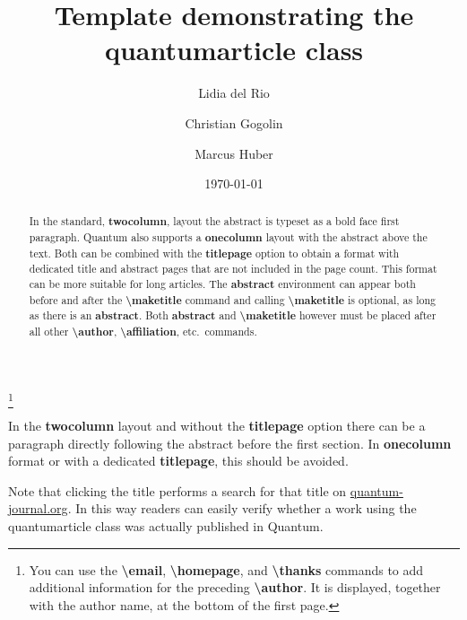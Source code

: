 \documentclass[prx,a4paper,aps,twocolumn,superscriptaddress,11pt]{quantumarticle}
\begin{document}
\title{Template demonstrating the quantumarticle class}
\date{\today}
\author{Lidia del Rio}
\author{Christian Gogolin}
\thanks{You can use the \textbf{\textbackslash{}email}, \textbf{\textbackslash{}homepage}, and \textbf{\textbackslash{}thanks} commands to add additional information for the preceding \textbf{\textbackslash{}author}. It is displayed, together with the author name, at the bottom of the first page.}
\author{Marcus Huber}

\maketitle

\begin{abstract}
  In the standard, \textbf{twocolumn}, layout the abstract is typeset as a bold face first paragraph.
  Quantum also supports a \textbf{onecolumn} layout with the abstract above the text.
  Both can be combined with the \textbf{titlepage} option to obtain a format with dedicated title and abstract pages that are not included in the page count.
  This format can be more suitable for long articles.
  The \textbf{abstract} environment can appear both before and after the \textbf{\textbackslash{}maketitle} command and calling \textbf{\textbackslash{}maketitle} is optional, as long as there is an \textbf{abstract}.
  Both \textbf{abstract} and \textbf{\textbackslash{}maketitle} however must be placed after all other \textbf{\textbackslash{}author}, \textbf{\textbackslash{}affiliation}, etc.\ commands.
\end{abstract}


In the \textbf{twocolumn} layout and without the \textbf{titlepage} option there can be a paragraph directly following the abstract before the first section.
In \textbf{onecolumn} format or with a dedicated \textbf{titlepage}, this should be avoided.

Note that clicking the title performs a search for that title on \href{http://quantum-journal.org}{quantum-journal.org}.
In this way readers can easily verify whether a work using the quantumarticle class was actually published in Quantum.
\end{document}
